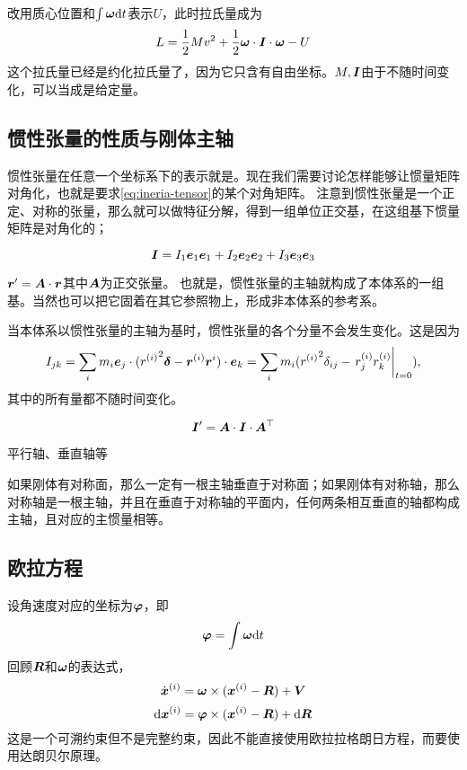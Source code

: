 改用质心位置和$\int \vb*{\omega} \dd t$表示$U$，此时拉氏量成为
\begin{equation}
    L = \frac{1}{2} M v^2 + \frac{1}{2} \vb*{\omega} \cdot \vb*{I} \cdot \vb*{\omega} - U
    \label{eq:rigid-body-lagrangian}
\end{equation}
这个拉氏量已经是约化拉氏量了，因为它只含有自由坐标。$M, \vb*{I}$由于不随时间变化，可以当成是给定量。

\subsection{惯性张量的性质与刚体主轴}

惯性张量在任意一个坐标系下的表示就是。现在我们需要讨论怎样能够让惯量矩阵对角化，也就是要求\eqref{eq:ineria-tensor}的某个对角矩阵。
注意到惯性张量是一个正定、对称的张量，那么就可以做特征分解，得到一组单位正交基，在这组基下惯量矩阵是对角化的；

\begin{equation}
    \vb*{I} = I_1 \vb*{e}_1 \vb*{e}_1 + I_2 \vb*{e}_2 \vb*{e}_2 + I_3 \vb*{e}_3 \vb*{e}_3
\end{equation}

$\vb*{r}' = \vb*{A} \cdot \vb*{r}$其中$\vb*{A}$为正交张量。
也就是，惯性张量的主轴就构成了本体系的一组基。当然也可以把它固着在其它参照物上，形成非本体系的参考系。

当本体系以惯性张量的主轴为基时，惯性张量的各个分量不会发生变化。这是因为
\[
    I_{jk} = \sum_i m_i \vb*{e}_j \cdot ({r^{(i)}}^2 \vb*{\delta} - \vb*{r}^{(i)}\vb*{r}^{i}) \cdot \vb*{e}_k = \sum_i m_i ({r^{(i)}}^2 \delta_{ij} - \eval{r^{(i)}_j r^{(i)}_k}_{t=0}),
\]
其中的所有量都不随时间变化。

\begin{equation}
    \vb*{I}' = \vb*{A} \cdot \vb*{I} \cdot \vb*{A}^\top
\end{equation}

平行轴、垂直轴等

如果刚体有对称面，那么一定有一根主轴垂直于对称面；如果刚体有对称轴，那么对称轴是一根主轴，并且在垂直于对称轴的平面内，任何两条相互垂直的轴都构成主轴，且对应的主惯量相等。

\subsection{欧拉方程}

设角速度对应的坐标为$\vb*{\varphi}$，即
\[
    \vb*{\varphi} = \int \vb*{\omega} \dd t
\]
回顾$\vb*{R}$和$\vb*{\omega}$的表达式，
\[
    \dot{\vb*{x}}^{(i)} = \vb*{\omega} \times (\vb*{x}^{(i)} - \vb*{R}) + \vb*{V}
\]
\[
    \dd{\vb*{x}^{(i)}} = \vb*{\varphi} \times (\vb*{x}^{(i)} - \vb*{R}) + \dd{\vb*{R}}
\]
这是一个可溯约束但不是完整约束，因此不能直接使用欧拉拉格朗日方程，而要使用达朗贝尔原理。


